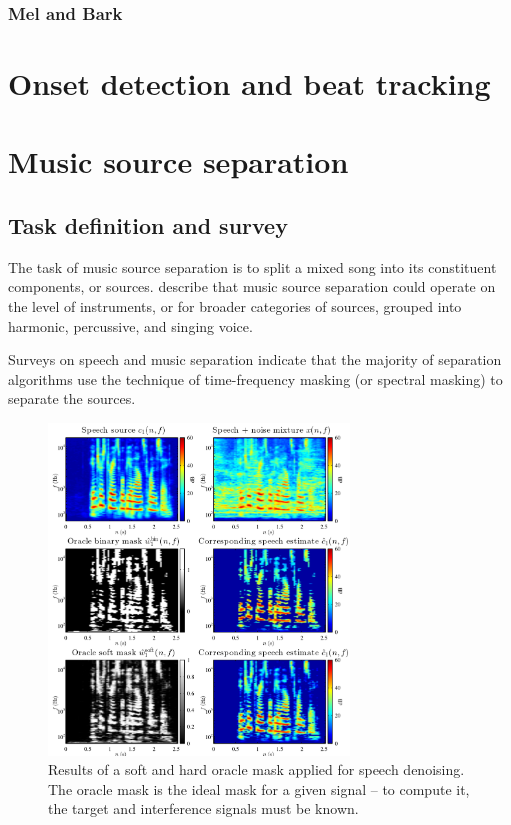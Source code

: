 \documentclass[letter,12pt,notitlepage]{article}
\begin{document}
\subsubsection{Mel and Bark}

\vfill
\clearpage

\section{Onset detection and beat tracking}
\label{sec:beattrack}

\vfill
\clearpage

\section{Music source separation}
\label{sec:musicsep}

\subsection{Task definition and survey}

The task of music source separation is to split a mixed song into its constituent components, or sources. \citet{musicsepgood} describe that music source separation could operate on the level of instruments, or for broader categories of sources, grouped into harmonic, percussive, and singing voice.

Surveys on speech \cite{speechmask} and music separation \cite{musicmask} indicate that the majority of separation algorithms use the technique of time-frequency masking (or spectral masking) to separate the sources.

\begin{figure}
	\vspace{-1.0em}
	\includegraphics[width=8cm]{./maskdemo.png}
	\caption{Results of a soft and hard oracle mask applied for speech denoising. The oracle mask is the ideal mask for a given signal -- to compute it, the target and interference signals must be known.}
	\label{fig:masks}
	\vspace{-1.5em}
\end{figure}
\end{document}
